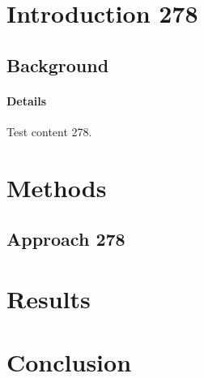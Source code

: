 \documentclass{article}
\begin{document}
\section{Introduction 278}
\subsection{Background}
\paragraph{Details} Test content 278.
\section{Methods}
\subsection{Approach 278}
\section{Results}
\section{Conclusion}
\end{document}
